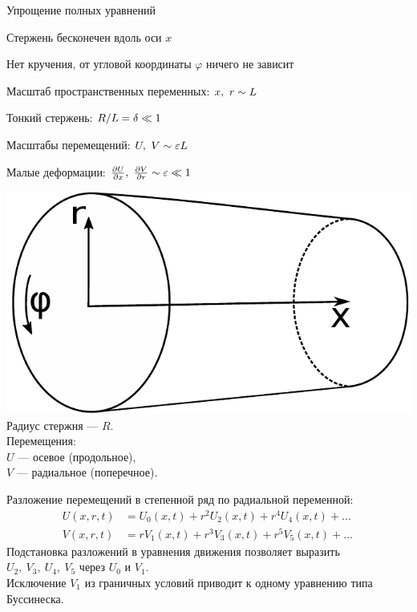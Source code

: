 \documentclass[usenames,dvipsnames]{beamer}
\newcommand{\pdiff}[2]{\frac{\partial #1}{\partial #2}}
\begin{document}
\begin{frame}{Упрощение полных уравнений}
\begin{itemize}%
	\hspace{-3mm}
	\begin{minipage}{.53\textwidth}
	\item Стержень бесконечен вдоль оси $x$
	\item Нет кручения, от угловой координаты $\varphi$ ничего не зависит
	\item Масштаб пространственных переменных: $\color{black}x,\ r \sim L$
	\item Тонкий стержень: $\color{black}R/L = \delta \ll 1$
	\item Масштабы перемещений: $\color{black}U,\ V \sim \varepsilon L$
	\item Малые деформации: $\color{black}\pdiff{U}{x},\ \pdiff{V}{r} \sim \varepsilon \ll 1$
	\end{minipage}
	\hspace{3mm}
	\begin{minipage}{.36\textwidth}
		\includegraphics[width=\linewidth]{Figures/1_RodSchematic}\\
		\footnotesize
		Радиус стержня --- $R$.\\
		Перемещения:\\
		$U$ --- осевое (продольное), \\
		$V$ --- радиальное (поперечное).
	\end{minipage}
\end{itemize}
\setlength{\belowdisplayskip}{1pt} \setlength{\belowdisplayshortskip}{0pt}
\setlength{\abovedisplayskip}{1pt} \setlength{\abovedisplayshortskip}{0pt}
Разложение перемещений в степенной ряд по радиальной переменной:
\begin{align*}
U(x,r,t) &= U_0(x,t) + r^2 U_2(x,t) + r^4 U_4(x,t) + \dots \\
V(x,r,t) &= r V_1(x,t) + r^3 V_3(x,t) + r^5 V_5(x,t) + \dots \,
\end{align*}
Подстановка разложений в уравнения движения позволяет выразить $U_2,\ V_3,\ U_4,\ V_5$ через $U_0$ и $V_1$. \\
\vspace{1mm}
Исключение $V_1$ из граничных условий приводит к одному уравнению типа Буссинеска.
\end{frame}
\end{document}
